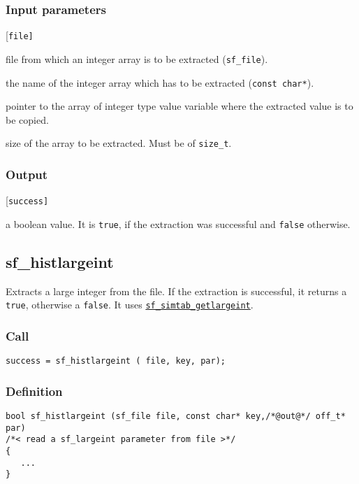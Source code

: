 \subsubsection*{Input parameters}
\begin{desclist}{\tt }{\quad}[\tt file]
   \setlength\itemsep{0pt}
   \item[file] file from which an integer array is to be extracted (\texttt{sf\_file}).
   \item[key]  the name of the integer array which has to be extracted (\texttt{const char*}).
   \item[par]  pointer to the array of integer type value variable where the extracted value is to be copied. 
   \item[n] size of the array to be extracted. Must be of \texttt{size\_t}.
\end{desclist}

\subsubsection*{Output}
\begin{desclist}{\tt }{\quad}[\tt success]
   \setlength\itemsep{0pt}
   \item[success] a boolean value. It is \texttt{true}, if the extraction was successful and \texttt{false} otherwise.
\end{desclist}




\subsection{{sf\_histlargeint}}
Extracts a large integer from the file. If the extraction is successful, it returns a \texttt{true}, otherwise a \texttt{false}. 
It uses \hyperref[sec:sf_simtab_getlargeint]{\texttt{sf\_simtab\_getlargeint}}.

\subsubsection*{Call}
\begin{verbatim}success = sf_histlargeint ( file, key, par);\end{verbatim}

\subsubsection*{Definition}
\begin{verbatim}
bool sf_histlargeint (sf_file file, const char* key,/*@out@*/ off_t* par)
/*< read a sf_largeint parameter from file >*/ 
{
   ...
}
\end{verbatim}

